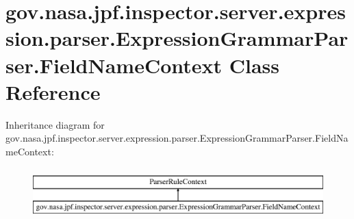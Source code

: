 \hypertarget{classgov_1_1nasa_1_1jpf_1_1inspector_1_1server_1_1expression_1_1parser_1_1_expression_grammar_parser_1_1_field_name_context}{}\section{gov.\+nasa.\+jpf.\+inspector.\+server.\+expression.\+parser.\+Expression\+Grammar\+Parser.\+Field\+Name\+Context Class Reference}
\label{classgov_1_1nasa_1_1jpf_1_1inspector_1_1server_1_1expression_1_1parser_1_1_expression_grammar_parser_1_1_field_name_context}
Inheritance diagram for gov.\+nasa.\+jpf.\+inspector.\+server.\+expression.\+parser.\+Expression\+Grammar\+Parser.\+Field\+Name\+Context\+:\begin{figure}[H]
\begin{center}
\leavevmode
\includegraphics[height=2.000000cm]{classgov_1_1nasa_1_1jpf_1_1inspector_1_1server_1_1expression_1_1parser_1_1_expression_grammar_parser_1_1_field_name_context}
\end{center}
\end{figure}
